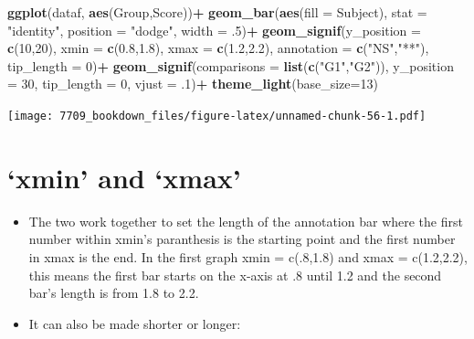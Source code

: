 \documentclass[]{book}
\newenvironment{Shaded}{\begin{snugshade}}{\end{snugshade}}
\newcommand{\DataTypeTok}[1]{\textcolor[rgb]{0.13,0.29,0.53}{#1}}
\newcommand{\DecValTok}[1]{\textcolor[rgb]{0.00,0.00,0.81}{#1}}
\newcommand{\FloatTok}[1]{\textcolor[rgb]{0.00,0.00,0.81}{#1}}
\newcommand{\KeywordTok}[1]{\textcolor[rgb]{0.13,0.29,0.53}{\textbf{#1}}}
\newcommand{\NormalTok}[1]{#1}
\newcommand{\OperatorTok}[1]{\textcolor[rgb]{0.81,0.36,0.00}{\textbf{#1}}}
\newcommand{\StringTok}[1]{\textcolor[rgb]{0.31,0.60,0.02}{#1}}
\providecommand{\tightlist}{%
  \setlength{\itemsep}{0pt}\setlength{\parskip}{0pt}}
\begin{document}
\begin{Shaded}
\begin{Highlighting}[]
\KeywordTok{ggplot}\NormalTok{(dataf, }\KeywordTok{aes}\NormalTok{(Group,Score))}\OperatorTok{+}
\StringTok{  }\KeywordTok{geom_bar}\NormalTok{(}\KeywordTok{aes}\NormalTok{(}\DataTypeTok{fill =}\NormalTok{ Subject), }\DataTypeTok{stat =} \StringTok{"identity"}\NormalTok{, }
           \DataTypeTok{position =} \StringTok{"dodge"}\NormalTok{, }\DataTypeTok{width =} \FloatTok{.5}\NormalTok{)}\OperatorTok{+}
\StringTok{  }\KeywordTok{geom_signif}\NormalTok{(}\DataTypeTok{y_position =} \KeywordTok{c}\NormalTok{(}\DecValTok{10}\NormalTok{,}\DecValTok{20}\NormalTok{), }\DataTypeTok{xmin =} \KeywordTok{c}\NormalTok{(}\FloatTok{0.8}\NormalTok{,}\FloatTok{1.8}\NormalTok{), }
              \DataTypeTok{xmax =} \KeywordTok{c}\NormalTok{(}\FloatTok{1.2}\NormalTok{,}\FloatTok{2.2}\NormalTok{), }\DataTypeTok{annotation =} \KeywordTok{c}\NormalTok{(}\StringTok{"NS"}\NormalTok{,}\StringTok{"**"}\NormalTok{),}
              \DataTypeTok{tip_length =} \DecValTok{0}\NormalTok{)}\OperatorTok{+}
\StringTok{  }\KeywordTok{geom_signif}\NormalTok{(}\DataTypeTok{comparisons =} \KeywordTok{list}\NormalTok{(}\KeywordTok{c}\NormalTok{(}\StringTok{"G1"}\NormalTok{,}\StringTok{"G2"}\NormalTok{)), }\DataTypeTok{y_position =} \DecValTok{30}\NormalTok{,}
              \DataTypeTok{tip_length =} \DecValTok{0}\NormalTok{, }\DataTypeTok{vjust =} \FloatTok{.1}\NormalTok{)}\OperatorTok{+}
\StringTok{  }\KeywordTok{theme_light}\NormalTok{(}\DataTypeTok{base_size=}\DecValTok{13}\NormalTok{)}
\end{Highlighting}
\end{Shaded}

\texttt{[image: 7709\_bookdown\_files/figure-latex/unnamed-chunk-56-1.pdf]}

\hypertarget{xmin-and-xmax}{%
\section{`xmin' and `xmax'}\label{xmin-and-xmax}}

\begin{itemize}
\tightlist
\item
  The two work together to set the length of the annotation bar where the first number within xmin's paranthesis is the starting point and the first number in xmax is the end. In the first graph xmin = c(.8,1.8) and xmax = c(1.2,2.2), this means the first bar starts on the x-axis at .8 until 1.2 and the second bar's length is from 1.8 to 2.2.
\item
  It can also be made shorter or longer:
\end{itemize}
\end{document}
